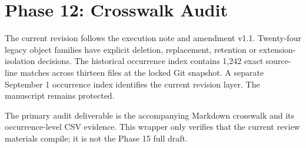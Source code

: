 \documentclass[11pt]{article}
\begin{document}
\section*{Phase 12: Crosswalk Audit}
The current revision follows the execution note and amendment v1.1.
Twenty-four legacy object families have explicit deletion, replacement,
retention or extension-isolation decisions. The historical occurrence index
contains 1,242 exact source-line matches across thirteen files at the locked
Git snapshot. A separate September 1 occurrence index identifies the current
revision layer. The manuscript remains protected.

The primary audit deliverable is the accompanying Markdown crosswalk and
its occurrence-level CSV evidence. This wrapper only verifies that the
current review materials compile; it is not the Phase 15 full draft.
\end{document}
